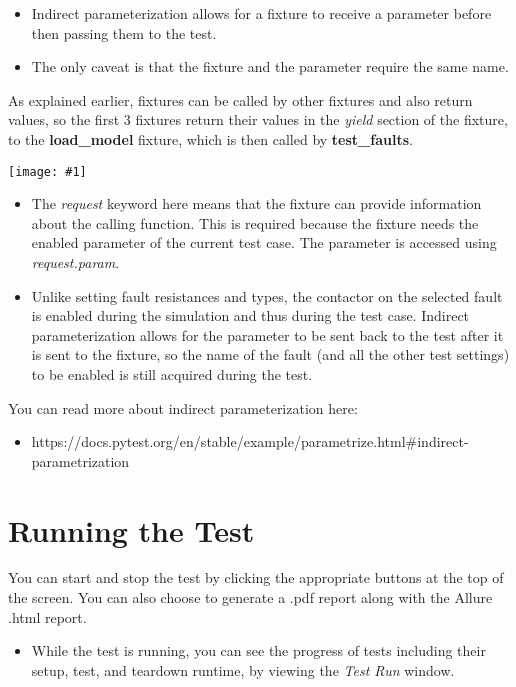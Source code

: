 \documentclass{article}
\newcommand{\centerimage}[2]{%
    \begin{center}
        \centerline{\texttt{[image: \#1]}}
    \end{center}%
}
\begin{document}
\begin{itemize}
    \item Indirect parameterization allows for a fixture to receive a parameter before then passing them to the test.
    \item The only caveat is that the fixture and the parameter require the same name.
\end{itemize}

 As explained earlier, fixtures can be called by other fixtures and also return values, so the first 3 fixtures return their values in the \textit{yield} section of the fixture, to the \textbf{load\_model} fixture, which is then called by \textbf{test\_faults}. 

\centerimage{setfaulttypefixture.png}{3cm}
 
 \begin{itemize}
    \item The \textit{request} keyword here means that the fixture can provide information about the calling function. This is required because the fixture needs the enabled parameter of the current test case. The parameter is accessed using \textit{request.param}. 
     \item Unlike setting fault resistances and types, the contactor on the selected fault is enabled during the simulation and thus during the test case. Indirect parameterization allows for the parameter to be sent back to the test after it is sent to the fixture, so the name of the fault (and all the other test settings) to be enabled is still acquired during the test. 
 \end{itemize}

 You can read more about indirect parameterization here:
\begin{itemize}
    \item https://docs.pytest.org/en/stable/example/parametrize.html\#indirect-parametrization
\end{itemize}

\section{Running the Test}
You can start and stop the test by clicking the appropriate buttons at the top of the screen. You can also choose to generate a .pdf report along with the Allure .html report.\\ 

\begin{itemize}
    \item While the test is running, you can see the progress of tests including their setup, test, and teardown runtime, by viewing the \textit{Test Run} window.
\end{itemize}
\end{document}

